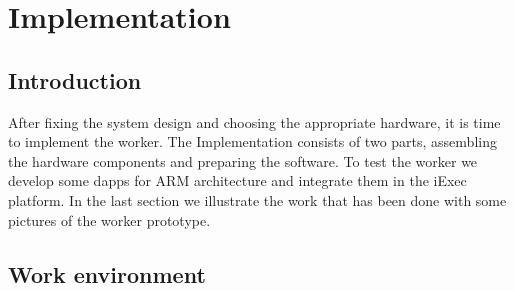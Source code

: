 

\chapter{Implementation}


\section{Introduction}
After fixing the system design and choosing the appropriate hardware, it is time to implement the worker.
The Implementation consists of two parts, assembling the hardware components and preparing the software.
To test the worker we develop some dapps for ARM architecture and integrate them in the iExec platform.
In the last section we illustrate the work that has been done with some pictures of the worker prototype.

\section{Work environment}


